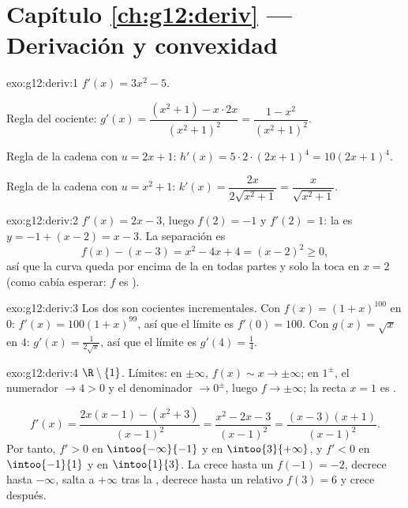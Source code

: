 \section*{Capítulo \ref{ch:g12:deriv} --- Derivación y convexidad}

\begin{solution}{exo:g12:deriv:1}
$f'(x) = 3x^2 - 5$.

Regla del cociente:
$g'(x) = \dfrac{(x^2+1) - x\cdot 2x}{(x^2+1)^2} = \dfrac{1 - x^2}{(x^2+1)^2}$.

Regla de la cadena con $u = 2x+1$:
$h'(x) = 5 \cdot 2 \cdot (2x+1)^4 = 10(2x+1)^4$.

Regla de la cadena con $u = x^2 + 1$:
$k'(x) = \dfrac{2x}{2\sqrt{x^2+1}} = \dfrac{x}{\sqrt{x^2+1}}$.
\end{solution}

\begin{solution}{exo:g12:deriv:2}
$f'(x) = 2x - 3$, luego $f(2) = -1$ y $f'(2) = 1$: la  es
$y = -1 + (x - 2) = x - 3$. La separación es
\[
f(x) - (x - 3) = x^2 - 4x + 4 = (x-2)^2 \geq 0 ,
\]
así que la curva queda por encima de la  en todas partes y solo la
toca en $x = 2$ (como cabía esperar: $f$ es ).
\end{solution}

\begin{solution}{exo:g12:deriv:3}
Los dos son cocientes incrementales. Con $f(x) = (1+x)^{100}$ en $0$:
$f'(x) = 100(1+x)^{99}$, así que el límite es $f'(0) = 100$. Con
$g(x) = \sqrt{x}$ en $4$: $g'(x) = \frac{1}{2\sqrt{x}}$, así que el límite
es $g'(4) = \frac14$.
\end{solution}

\begin{solution}{exo:g12:deriv:4}
 $\R \setminus \{1\}$. Límites: en $\pm\infty$,
$f(x) \sim x \to \pm\infty$; en $1^\pm$, el numerador $\to 4 > 0$ y el
denominador $\to 0^\pm$, luego $f \to \pm\infty$; la recta $x = 1$ es
.

\[
f'(x) = \frac{2x(x-1) - (x^2+3)}{(x-1)^2} = \frac{x^2 - 2x - 3}{(x-1)^2}
= \frac{(x-3)(x+1)}{(x-1)^2}.
\]
Por tanto, $f' > 0$ en $\intoo{-\infty}{-1}$ y en $\intoo{3}{+\infty}$, y
$f' < 0$ en $\intoo{-1}{1}$ y en $\intoo{1}{3}$. La  crece hasta un
 $f(-1) = -2$, decrece hasta $-\infty$, salta a $+\infty$
tras la , decrece hasta un  relativo $f(3) = 6$ y crece
después.
\end{solution}


